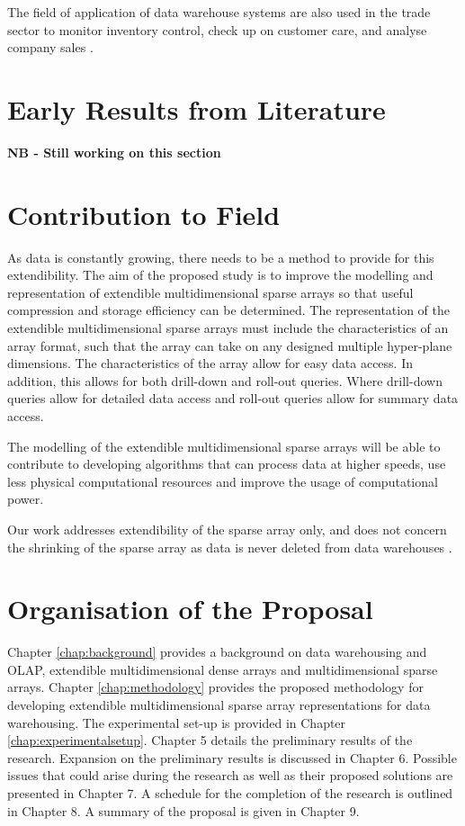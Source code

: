 The field of application of data warehouse systems are also used in the trade sector to monitor inventory control, check up on customer care, and analyse company sales \cite{golfarelli:2009:dwd}.

\section{Early Results from Literature}
\textbf{NB - Still working on this section}

\section{Contribution to Field}
As data is constantly growing, there needs to be a method to provide for this extendibility. The aim of the proposed study is to improve the modelling and representation of extendible multidimensional sparse arrays so that useful compression and storage efficiency can be determined. The representation of the extendible multidimensional sparse arrays must include the characteristics of an array format, such that the array can take on any designed multiple hyper-plane dimensions. The characteristics of the array allow for easy data access. In addition, this allows for both drill-down and roll-out queries. Where drill-down queries allow for detailed data access and roll-out queries allow for summary data access.

The modelling of the extendible multidimensional sparse arrays will be able to contribute to developing algorithms that can process data at higher speeds, use less physical computational resources and improve the usage of computational power.

Our work addresses extendibility of the sparse array only, and does not concern the shrinking of the sparse array as data is never deleted from data warehouses \cite{golfarelli:2009:dwd}.

\section{Organisation of the Proposal}%
Chapter \ref{chap:background} provides a background on data warehousing and OLAP, extendible multidimensional dense arrays and multidimensional sparse arrays. Chapter \ref{chap:methodology} provides the proposed methodology for developing extendible multidimensional sparse array representations for data warehousing. The experimental set-up is provided in Chapter \ref{chap:experimentalsetup}. Chapter 5 details the preliminary results of the research. Expansion on the preliminary results is discussed in Chapter 6. Possible issues that could arise during the research as well as their proposed solutions are presented in Chapter 7. A schedule for the completion of the research is outlined in Chapter 8. A summary of the proposal is given in Chapter 9. 